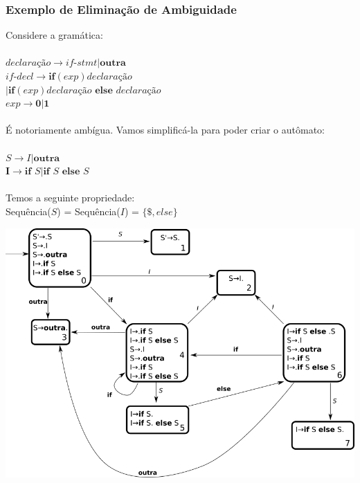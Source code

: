 \documentclass[table]{beamer}
\begin{document}
\begin{frame}
   \frametitle{Exemplo de Eliminação de Ambiguidade}
   Considere a gramática: \\
   \\
   $\textit{declaração}\to \textit{if-stmt}|\textbf{outra}$ \\
   $\textit{if-decl} \to \textbf{if}(exp) \textit{declaração}$ \\
   $|\textbf{if}(exp)\textit{declaração }\textbf{else }\textit{declaração}$ \\
   $exp\to\textbf{0}|\textbf{1}$ \\
   \\
   É notoriamente ambígua. Vamos simplificá-la para poder criar o autômato: \\
   \\
   $S\to I|\textbf{outra}$ \\
   $\textbf{I}\to\textbf{if }S|\textbf{if }S\textbf{ else }S$ \\
   \\
   Temos a seguinte propriedade: \\
   Sequência($S$) = Sequência($I$) = $\{\$, else\}$
\end{frame}

\begin{frame}
   \includegraphics[width=\linewidth,height=\textheight,keepaspectratio]{figuras/ifthenelsedfa.png}
\end{frame}
\end{document}
